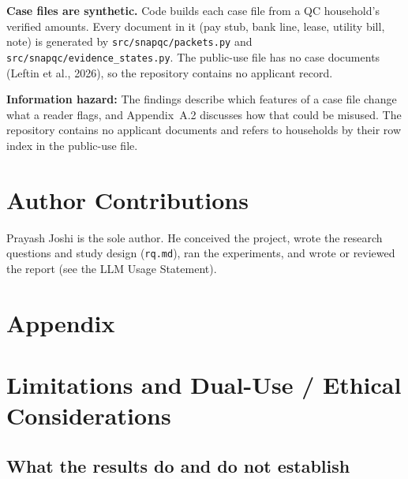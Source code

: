 \documentclass[sigconf,nonacm,screen]{acmart}
\begin{document}
\textbf{Case files are synthetic.} Code builds each case file from a QC household's verified amounts. Every document in it (pay stub, bank line, lease, utility bill, note) is generated by \texttt{src/snapqc/packets.py} and \texttt{src/snapqc/evidence\_states.py}. The public-use file has no case documents (Leftin et al., 2026), so the repository contains no applicant record.

\textbf{Information hazard:} The findings describe which features of a case file change what a reader flags, and Appendix~A.2 discusses how that could be misused. The repository contains no applicant documents and refers to households by their row index in the public-use file.

\section*{Author Contributions}

Prayash Joshi is the sole author. He conceived the project, wrote the research questions and study design (\texttt{rq.md}), ran the experiments, and wrote or reviewed the report (see the LLM Usage Statement).

\nocite{afane2026,bgl2026,chohlaswood2026,davidson2026,gosciak2026,leftin2026,publiclaw119-21,solomon2026,usda2025,usman2026}




\appendix

\section*{Appendix}

\section{Limitations and Dual-Use / Ethical Considerations}

\subsection{What the results do and do not establish}
\end{document}
